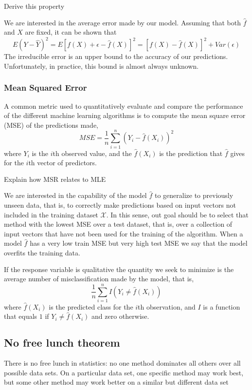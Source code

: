 {\color{red} Derive this property}

We are interested in the average error made by our model. Assuming that both $\hat{f}$ and $X$ are fixed, it can be shown that
\[
    E\left(Y-\hat{Y}\right)^{2}=E\left[f\left(X\right)+\epsilon-\hat{f}\left(X\right)\right]^{2}=\left[f\left(X\right)-\hat{f}\left(X\right)\right]^{2}+Var\left(\epsilon\right)
\]
The irreducible error is an upper bound to the accuracy of our predictions. Unfortunately, in practice, this bound is almost always unknown.


\subsubsection{Mean Squared Error}

A common metric used to quantitatively evaluate and compare the performance of the different machine learning algorithms is to compute the mean square error (MSE) of the predictions made,
\[
    MSE = \frac{1}{n} \sum_{i=1}^n \left( Y_i - \hat{f}(X_i) \right) ^ 2
\]
where $Y_i$ is the $i$th observed value, and the $\hat{f}(X_i)$ is the prediction that $\hat{f}$ gives for the $i$th vector of predictors.

    {\color{red} Explain how MSR relates to MLE}

We are interested in the capability of the model $\hat{f}$ to generalize to previously unseen data, that is, to correctly make predictions based on input vectors not included in the training dataset $\mathcal{X}$. In this sense, out goal should be to select that method with the lowest MSE over a test dataset, that is, over a collection of input vectors that have not been used for the training of the algorithm. When a model $\hat{f}$ has a very low train MSE but very high test MSE we say that the model overfits the training data.

If the response variable is qualitative the quantity we seek to minimize is the average number of misclassification made by the model, that is,
\[
    \frac{1}{n} \sum_{i=1}^n I \left( Y_i \neq \hat{f}(X_i) \right)
\]
where $\hat{f}(X_i)$ is the predicted class for the $i$th observation, and $I$ is a function that equals $1$ if $Y_i \neq \hat{f}(X_i)$ and zero otherwise.

\subsection{No free lunch theorem}

{\color{red} There is no free lunch in statistics: no one method dominates all others over all possible data sets. On a particular data set, one specific method may work best, but some other method may work better on a similar but different data set}

